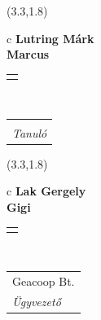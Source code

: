 \documentclass[11pt]{article}
\begin{document}
\makebox(3.3,1.8){
  \renewcommand\arraystretch{1.3}
  \begin{tabular}[c]{c}
    \hspace{8.5mm}
    \LARGE\bf{ Lutring Márk }\\
    \hspace{8.5mm}
    \Large{ Marcus }\\
    \renewcommand\arraystretch{3}
    \begin{tabular}[c]{c}
      \centering
      \fontfamily{phv}\selectfont{
        \textbf{
          \textsc{
            \scriptsize{
            \color{Dark}{ Ismerkedő }\color{Bright}{ Webmester }\color{Bright}{ Sminkmester }\color{Bright}{ Programozó }
            }
          }
        }
      }
    \end{tabular}
    \\
    \renewcommand\arraystretch{1}
    \begin{tabular}{p{3.3in}}
      \hspace{.7cm}\\
      \hspace{.7cm}\emph{ Tanuló }\\
    \end{tabular}
  \end{tabular}
}

\makebox(3.3,1.8){
  \renewcommand\arraystretch{1.3}
  \begin{tabular}[c]{c}
    \hspace{8.5mm}
    \LARGE\bf{ Lak Gergely }\\
    \hspace{8.5mm}
    \Large{ Gigi }\\
    \renewcommand\arraystretch{3}
    \begin{tabular}[c]{c}
      \centering
      \fontfamily{phv}\selectfont{
        \textbf{
          \textsc{
            \scriptsize{
            \color{Dark}{ Ismerkedő }\color{Dark}{ Webmester }\color{Bright}{ Sminkmester }\color{Bright}{ Programozó }
            }
          }
        }
      }
    \end{tabular}
    \\
    \renewcommand\arraystretch{1}
    \begin{tabular}{p{3.3in}}
      \hspace{.7cm}Geacoop Bt.\\
      \hspace{.7cm}\emph{ Ügyvezető }\\
    \end{tabular}
  \end{tabular}
}
\end{document}
